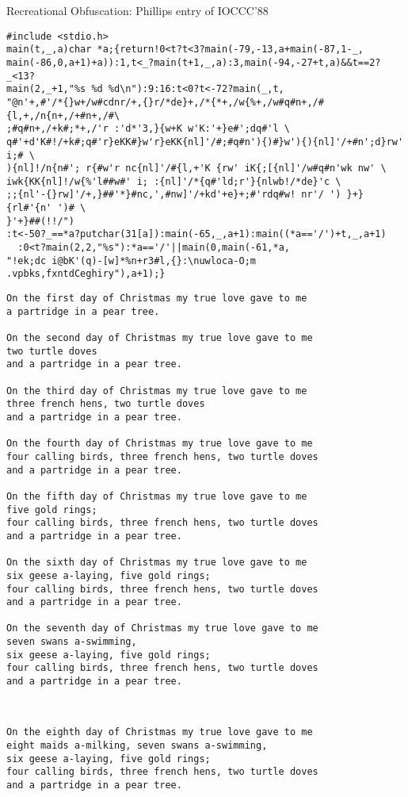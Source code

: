\begin{frame}[fragile]{Recreational Obfuscation: Phillips entry of IOCCC'88}
  \begin{Verbatim}[fontsize=\footnotesize,frame=single,label=Program code]
#include <stdio.h>
main(t,_,a)char *a;{return!0<t?t<3?main(-79,-13,a+main(-87,1-_,
main(-86,0,a+1)+a)):1,t<_?main(t+1,_,a):3,main(-94,-27+t,a)&&t==2?_<13?
main(2,_+1,"%s %d %d\n"):9:16:t<0?t<-72?main(_,t,
"@n'+,#'/*{}w+/w#cdnr/+,{}r/*de}+,/*{*+,/w{%+,/w#q#n+,/#{l,+,/n{n+,/+#n+,/#\
;#q#n+,/+k#;*+,/'r :'d*'3,}{w+K w'K:'+}e#';dq#'l \
q#'+d'K#!/+k#;q#'r}eKK#}w'r}eKK{nl]'/#;#q#n'){)#}w'){){nl]'/+#n';d}rw' i;# \
){nl]!/n{n#'; r{#w'r nc{nl]'/#{l,+'K {rw' iK{;[{nl]'/w#q#n'wk nw' \
iwk{KK{nl]!/w{%'l##w#' i; :{nl]'/*{q#'ld;r'}{nlwb!/*de}'c \
;;{nl'-{}rw]'/+,}##'*}#nc,',#nw]'/+kd'+e}+;#'rdq#w! nr'/ ') }+}{rl#'{n' ')# \
}'+}##(!!/")
:t<-50?_==*a?putchar(31[a]):main(-65,_,a+1):main((*a=='/')+t,_,a+1)
  :0<t?main(2,2,"%s"):*a=='/'||main(0,main(-61,*a,
"!ek;dc i@bK'(q)-[w]*%n+r3#l,{}:\nuwloca-O;m .vpbks,fxntdCeghiry"),a+1);}
  \end{Verbatim}    
  \begin{minipage}{.5\linewidth}
  \begin{Verbatim}[fontsize=\tiny,frame=single,label=Output]
On the first day of Christmas my true love gave to me
a partridge in a pear tree.

On the second day of Christmas my true love gave to me
two turtle doves
and a partridge in a pear tree.

On the third day of Christmas my true love gave to me
three french hens, two turtle doves
and a partridge in a pear tree.

On the fourth day of Christmas my true love gave to me
four calling birds, three french hens, two turtle doves
and a partridge in a pear tree.

On the fifth day of Christmas my true love gave to me
five gold rings;
four calling birds, three french hens, two turtle doves
and a partridge in a pear tree.

On the sixth day of Christmas my true love gave to me
six geese a-laying, five gold rings;
four calling birds, three french hens, two turtle doves
and a partridge in a pear tree.

On the seventh day of Christmas my true love gave to me
seven swans a-swimming,
six geese a-laying, five gold rings;
four calling birds, three french hens, two turtle doves
and a partridge in a pear tree.

  \end{Verbatim}    
  \end{minipage}~\begin{minipage}{.5\linewidth}
  \begin{Verbatim}[fontsize=\tiny,frame=single,label=Output (cont)]
On the eighth day of Christmas my true love gave to me
eight maids a-milking, seven swans a-swimming,
six geese a-laying, five gold rings;
four calling birds, three french hens, two turtle doves
and a partridge in a pear tree.


\end{Verbatim}
\end{minipage}
\end{frame}
